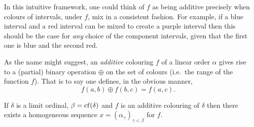 In this intuitive framework, one could think of $f$ as being additive precisely
when colours of intervals, under $f$, mix in a consistent fashion.  For example,
if a blue interval and a red interval can be mixed to create a purple interval
then this should be the case for \textit{any} choice of the component intervals,
given that the first one is blue and the second red.

\begin{rem}
	As the name might suggest, an \textit{additive} colouring $f$ of a linear
	order $\alpha$ gives rise to a (partial) binary operation $\oplus$ on the
	set of colours (i.e.\ the range of the function $f$).  That is to say one
	defines, in the obvious manner,
	\begin{equation}
		f(a,b)\oplus f(b,c)=f(a,c).
	\end{equation}
\end{rem}

\begin{thm}
	If $\delta$ is a limit ordinal, $\beta=\operatorname{cf}(\delta)$ and $f$ is an additive
	colouring of $\delta$ then there exists a homogeneous sequence
	$x=(\alpha_\gamma)_{\gamma<\beta}$ for $f$.
\end{thm}

